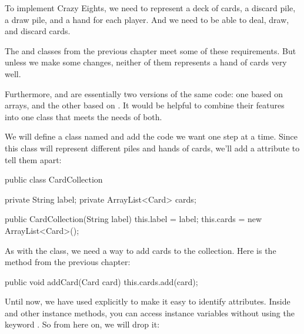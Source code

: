 To implement Crazy Eights, we need to represent a deck of cards, a discard pile, a draw pile, and a hand for each player.
And we need to be able to deal, draw, and discard cards.

The  and  classes from the previous chapter meet some of these requirements.
But unless we make some changes, neither of them represents a hand of cards very well.


Furthermore,  and  are essentially two versions of the same code: one based on arrays, and the other based on .
It would be helpful to combine their features into one class that meets the needs of both.

We will define a class named  and add the code we want one step at a time.
Since this class will represent different piles and hands of cards, we'll add a  attribute to tell them apart:


\begin{code}
public class CardCollection {

    private String label;
    private ArrayList<Card> cards;

    public CardCollection(String label) {
        this.label = label;
        this.cards = new ArrayList<Card>();
    }
}
\end{code}


As with the  class, we need a way to add cards to the collection.
Here is the  method from the previous chapter:

\begin{code}
public void addCard(Card card) {
    this.cards.add(card);
}
\end{code}


Until now, we have used  explicitly to make it easy to identify attributes.
Inside  and other instance methods, you can access instance variables without using the keyword .
So from here on, we will drop it:

